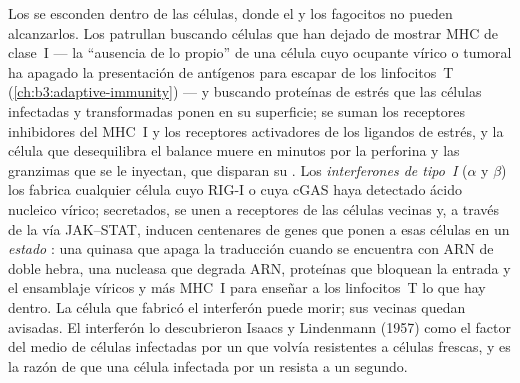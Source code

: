 \begin{definition}\label{def:b3:innate-immunity:nk-ifn}
Los  se esconden dentro de las células, donde el  y los
fagocitos no pueden alcanzarlos. Los \emph{} patrullan buscando células que han dejado de mostrar MHC de
clase~I --- la ``ausencia de lo propio'' de una célula cuyo ocupante
vírico o tumoral ha apagado la presentación de antígenos para escapar de
los linfocitos~T (\cref{ch:b3:adaptive-immunity}) --- y buscando
proteínas de estrés que las células infectadas y transformadas ponen en
su superficie; se suman los receptores inhibidores del MHC~I y los
receptores activadores de los ligandos de estrés, y la célula que
desequilibra el balance muere en minutos por la perforina y las
granzimas que se le inyectan, que disparan su . Los
\emph{interferones de tipo~I} ($\alpha$ y $\beta$) los fabrica cualquier
célula cuyo RIG-I o cuya cGAS haya detectado ácido nucleico vírico;
secretados, se unen a receptores de las células vecinas y, a través de la
vía JAK--STAT, inducen centenares de genes que ponen a esas células en un
\emph{estado }: una quinasa que apaga la traducción cuando se
encuentra con ARN de doble hebra, una nucleasa que degrada ARN, proteínas
que bloquean la entrada y el ensamblaje víricos y más MHC~I para enseñar
a los linfocitos~T lo que hay dentro. La célula que fabricó el interferón
puede morir; sus vecinas quedan avisadas. El interferón lo descubrieron
Isaacs y Lindenmann (1957) como el factor del medio de células infectadas
por un  que volvía resistentes a células frescas, y es la razón de
que una célula infectada por un  resista a un segundo.
\end{definition}

